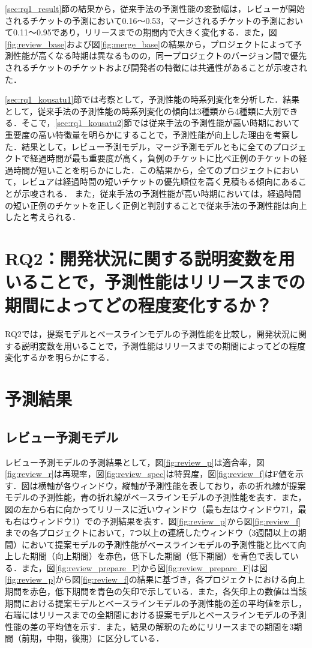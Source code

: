 \documentclass[submit]{ipsj}
\newcommand{\rqtwo}{開発状況に関する説明変数を用いることで，予測性能はリリースまでの期間によってどの程度変化するか？}
\begin{document}
\ref{sec:rq1_result}節の結果から，従来手法の予測性能の変動幅は，レビューが開始されるチケットの予測において0.16〜0.53，マージされるチケットの予測において0.11〜0.95であり，リリースまでの期間内で大きく変化する．また，図\ref{fig:review_base}および図\ref{fig:merge_base}の結果から，プロジェクトによって予測性能が高くなる時期は異なるものの，同一プロジェクトのバージョン間で優先されるチケットのチケットおよび開発者の特徴には共通性があることが示唆された．

\ref{sec:rq1_kousatu1}節では考察として，予測性能の時系列変化を分析した．結果として，従来手法の予測性能の時系列変化の傾向は3種類から4種類に大別できる．そこで，\ref{sec:rq1_kousatu2}節では従来手法の予測性能が高い時期において重要度の高い特徴量を明らかにすることで，予測性能が向上した理由を考察した．結果として，レビュー予測モデル，マージ予測モデルともに全てのプロジェクトで経過時間が最も重要度が高く，負例のチケットに比べ正例のチケットの経過時間が短いことを明らかにした．この結果から，全てのプロジェクトにおいて，レビュアは経過時間の短いチケットの優先順位を高く見積もる傾向にあることが示唆される．
また，従来手法の予測性能が高い時期においては，経過時間の短い正例のチケットを正しく正例と判別することで従来手法の予測性能は向上したと考えられる．


\section{RQ2：\rqtwo}\label{sec:rq2}
RQ2では，提案モデルとベースラインモデルの予測性能を比較し，開発状況に関する説明変数を用いることで，予測性能はリリースまでの期間によってどの程度変化するかを明らかにする．

\section{予測結果}\label{sec:rq2_result}
\subsection{レビュー予測モデル}\label{sec:rq2_review}
レビュー予測モデルの予測結果として，図\ref{fig:review_p}は適合率，図\ref{fig:review_r}は再現率，図\ref{fig:review_spec}は特異度，図\ref{fig:review_f}はF値を示す．図は横軸が各ウィンドウ，縦軸が予測性能を表しており，赤の折れ線が提案モデルの予測性能，青の折れ線がベースラインモデルの予測性能を表す．また，図の左から右に向かってリリースに近いウィンドウ（最も左はウィンドウ71，最も右はウィンドウ1）での予測結果を表す．図\ref{fig:review_p}から図\ref{fig:review_f}までの各プロジェクトにおいて，7つ以上の連続したウィンドウ（3週間以上の期間）において提案モデルの予測性能がベースラインモデルの予測性能と比べて向上した期間（向上期間）を赤色，低下した期間（低下期間）を青色で表している．また，図\ref{fig:review_prepare_P}から図\ref{fig:review_prepare_F}は図\ref{fig:review_p}から図\ref{fig:review_f}の結果に基づき，各プロジェクトにおける向上期間を赤色，低下期間を青色の矢印で示している．また，各矢印上の数値は当該期間における提案モデルとベースラインモデルの予測性能の差の平均値を示し，右端にはリリースまでの全期間における提案モデルとベースラインモデルの予測性能の差の平均値を示す．また，結果の解釈のためにリリースまでの期間を3期間（前期，中期，後期）に区分している．
\end{document}
